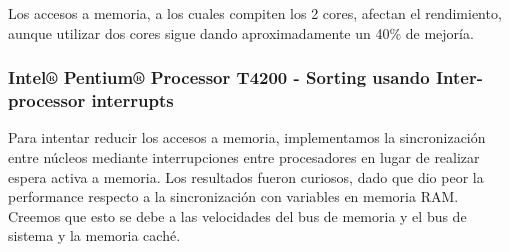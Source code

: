 	Los accesos a memoria, a los cuales compiten los 2 cores, afectan el rendimiento, aunque utilizar dos cores sigue dando aproximadamente un 40\% de mejoría.
	
\subsubsection{Intel® Pentium® Processor T4200 - Sorting usando Inter-processor interrupts}

Para intentar reducir los accesos a memoria, implementamos la sincronización entre núcleos mediante interrupciones entre procesadores en lugar de realizar espera activa a memoria. Los resultados fueron curiosos, dado que dio peor la performance respecto a la sincronización con variables en memoria RAM. Creemos que esto se debe a las velocidades del bus de memoria y el bus de sistema y la memoria caché.

